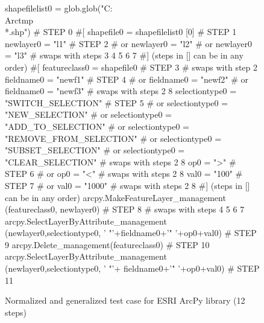 \begin{figure}
{\scriptsize 
\begin{code}
shapefilelist0 = 
   glob.glob("C:\\Arctmp\\*.shp")        \textcolor{black!45}{\# STEP 0}
\textcolor{black!45}{\#[}
shapefile0 = shapefilelist0 [0]        \textcolor{black!45}{\# STEP 1}
newlayer0 = "l1"                       \textcolor{black!45}{\# STEP 2}
\textcolor{black!45}{\#  or newlayer0 = "l2" }
\textcolor{black!45}{\#  or newlayer0 = "l3" }
\textcolor{black!45}{\#  swaps with steps 3 4 5 6 7}
\textcolor{black!45}{\#] (steps in [] can be in any order)}
\textcolor{black!45}{\#[}
featureclass0 = shapefile0             \textcolor{black!45}{\# STEP 3}
\textcolor{black!45}{\#  swaps with step 2}
fieldname0 = "newf1"                   \textcolor{black!45}{\# STEP 4}
\textcolor{black!45}{\#  or fieldname0 = "newf2" }
\textcolor{black!45}{\#  or fieldname0 = "newf3" }
\textcolor{black!45}{\#  swaps with steps 2 8}
selectiontype0 = "SWITCH\_SELECTION"    \textcolor{black!45}{\# STEP 5}
\textcolor{black!45}{\#  or selectiontype0 = "NEW\_SELECTION" }
\textcolor{black!45}{\#  or selectiontype0 = "ADD\_TO\_SELECTION" }
\textcolor{black!45}{\#  or selectiontype0 = "REMOVE\_FROM\_SELECTION"}
\textcolor{black!45}{\#  or selectiontype0 = "SUBSET\_SELECTION"}
\textcolor{black!45}{\#  or selectiontype0 = "CLEAR\_SELECTION"   }
\textcolor{black!45}{\#  swaps with steps 2 8}
op0 = ">"                              \textcolor{black!45}{\# STEP 6}
\textcolor{black!45}{\#  or op0 = "<" }
\textcolor{black!45}{\#  swaps with steps 2 8}
val0 = "100"                           \textcolor{black!45}{\# STEP 7}
\textcolor{black!45}{\#  or val0 = "1000" }
\textcolor{black!45}{\#  swaps with steps 2 8}
\textcolor{black!45}{\#] (steps in [] can be in any order)}
arcpy.MakeFeatureLayer\_management
   (featureclass0, newlayer0)          \textcolor{black!45}{\# STEP 8}
\textcolor{black!45}{\#  swaps with steps 4 5 6 7}
arcpy.SelectLayerByAttribute\_management
   (newlayer0,selectiontype0,
   ' "'+fieldname0+'" '+op0+val0)      \textcolor{black!45}{\# STEP 9}
arcpy.Delete\_management(featureclass0) \textcolor{black!45}{\# STEP 10}
arcpy.SelectLayerByAttribute\_management
   (newlayer0,selectiontype0,
   ' "'+ fieldname0+'" '+op0+val0)     \textcolor{black!45}{\# STEP 11}
\end{code}
}
\caption{Normalized and generalized test case for ESRI ArcPy library
  (12 steps)}
\label{esrinormgen}
\end{figure}
